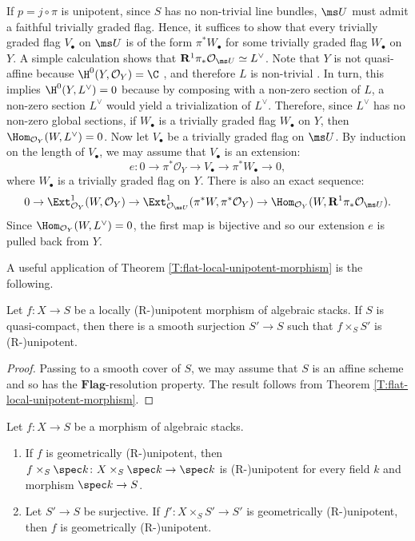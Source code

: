 \documentclass[reqno,a4paper]{amsart}
\numberwithin{Theorem}{section}
\newcommand{\Orb}{\mathcal{O}}
\newcommand{\Flag}{\mathbf{Flag}}
\theoremstyle{plain}
\theoremstyle{remark}
\newcommand{\spref}[1]{\href{https://stacks.math.columbia.edu/tag/#1}{#1}}
\newcommand{\RDERF}{\mathbf{R}}
\begin{document}
\begin{Example}
  If $p=j\circ \pi$ is unipotent, since $S$ has no non-trivial line
  bundles, $\ms U$ must admit a faithful trivially graded flag. Hence,
  it suffices to show that every trivially graded flag $V_\bullet$ on
  $\ms U$ is of the form $\pi^*W_{\bullet}$ for some trivially graded
  flag $W_\bullet$ on $Y$. A simple calculation shows that
  $\RDERF^1 \pi_*\Orb_{\ms U} \simeq L^\vee$. Note that $Y$ is not quasi-affine because $\H^0(Y,\mathcal{O}_Y)=\C$ \cite[Tag \spref{01P9}]{stacks-project}, and therefore $L$ is non-trivial  \cite[Tag \spref{01QE}]{stacks-project}. In turn, this implies $\H^0(Y,L^{\vee})=0$ because by composing with a non-zero section of $L$, a non-zero section $L^{\vee}$ would yield a trivialization of $L^{\vee}$. Therefore, since
  $L^{\vee}$ has no non-zero global sections, if $W_{\bullet}$ is a
  trivially graded flag $W_\bullet$ on $Y$, then
  $\Hom_{\Orb_{Y}}(W,L^\vee)=0$. Now let $V_\bullet$ be a trivially
  graded flag on $\ms U$. By induction on the length of $V_\bullet$,
  we may assume that $V_\bullet$ is an extension:
  \[
  e\colon  0 \to \pi^*\Orb_Y \to V_\bullet \to \pi^*W_\bullet \to 0,
  \]
  where $W_\bullet$ is a trivially graded flag on $Y$. There is also an exact sequence:
  \[
    0 \to \Ext^1_{\Orb_{Y}}(W,\Orb_Y) \to
    \Ext^1_{\Orb_{\ms U}}(\pi^*W,\pi^*\Orb_Y)
    \to \Hom_{\Orb_Y}(W,\RDERF^1\pi_*\Orb_{\ms U}).
  \]
  Since $\Hom_{\Orb_{Y}}(W,L^\vee)=0$, the first map is
  bijective and so our extension $e$ is pulled back from $Y$. 
\end{Example}
A useful application of Theorem
\ref{T:flat-local-unipotent-morphism} is the following.
\begin{corollary}\label{C:flat-local-implies-smooth-local-morphism}
  Let $f\colon X \to S$ be a locally (R-)unipotent
  morphism of algebraic stacks. If $S$ is quasi-compact, then there is a smooth surjection
  $S' \to S$ such that $f\times_S S'$ is (R-)unipotent.
\end{corollary}
\begin{proof}
  Passing to a smooth cover of $S$, we may assume that $S$ is an
  affine scheme and so has the $\Flag$-resolution property. The result 
  follows from Theorem \ref{T:flat-local-unipotent-morphism}.
\end{proof}
\begin{corollary}\label{C:geometric-unipotent-surj-local}
  Let $f \colon X \to S$ be a morphism of algebraic
  stacks.
  \begin{enumerate}
  \item \label{CI:geometric-unipotent-surj-local:every-point}If $f$ is geometrically (R-)unipotent, then
    $f\times_S \spec k \colon X\times_S \spec k \to \spec k$ is
    (R-)unipotent for every field $k$ and morphism $\spec k \to S$.
  \item \label{CI:geometric-unipotent-surj-local:surj}  Let $S' \to S$ be surjective. If
  $f' \colon X\times_{S} S' \to S'$ is geometrically (R-)unipotent,
  then $f$ is geometrically (R-)unipotent.  
  \end{enumerate}
\end{corollary}
\end{document}
